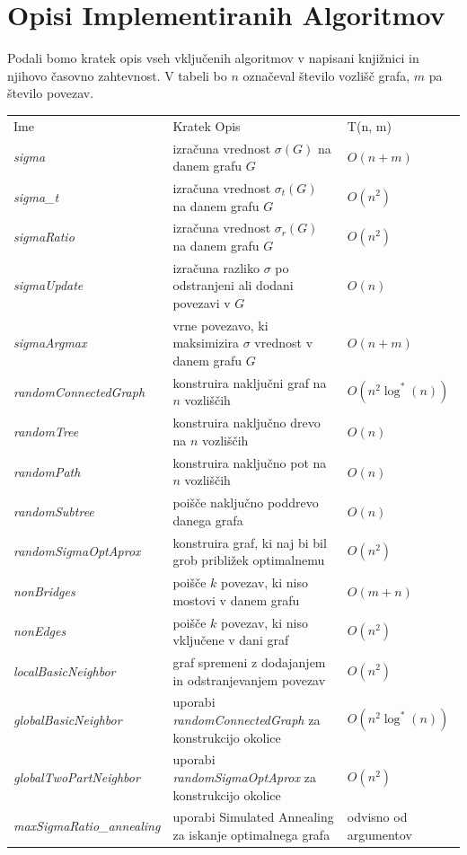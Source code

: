 \documentclass[ letterpaper, titlepage, fleqn]{article}
\begin{document}
\section{Opisi Implementiranih Algoritmov}
Podali bomo kratek opis vseh vključenih algoritmov v napisani knjižnici in njihovo časovno zahtevnost.
V tabeli bo $n$ označeval število vozlišč grafa, $m$ pa število povezav.
\begin{center}
    \begin{tabular}{ l  l  l}
      Ime & Kratek Opis & T(n, m) \\ 
      {\em sigma} & izračuna vrednost $\sigma(G)$ na danem grafu $G$ & $O(n + m)$ \\
      {\em sigma\_t} & izračuna vrednost $\sigma_t(G)$ na danem grafu $G$ & $O(n^2)$ \\
      {\em sigmaRatio} & izračuna vrednost $\sigma_r(G)$ na danem grafu $G$ & $O(n^2)$ \\
      {\em sigmaUpdate} & izračuna razliko $\sigma$ po odstranjeni ali dodani povezavi v $G$ & $O(n)$ \\
      {\em sigmaArgmax} & vrne povezavo, ki maksimizira $\sigma$ vrednost v danem grafu $G$ & $O(n + m)$ \\
      {\em randomConnectedGraph} & konstruira naključni graf na $n$ vozliščih &  $O(n^2 \log^*(n))$ \\ 
      {\em  randomTree} & konstruira naključno drevo na $n$  vozliščih & $O(n)$ \\
      {\em randomPath} & konstruira naključno pot na $n$ vozliščih & $O(n)$ \\
      {\em randomSubtree} & poišče naključno poddrevo danega grafa & $O(n)$ \\
      {\em randomSigmaOptAprox} & konstruira graf, ki naj bi bil grob približek optimalnemu & $O(n^2)$ \\
      {\em nonBridges} & poišče $k$ povezav, ki niso mostovi v danem grafu & $O(m + n)$ \\
      {\em nonEdges} & poišče $k$ povezav, ki niso vključene v dani graf & $O(n^2)$ \\
      {\em localBasicNeighbor} & graf spremeni z dodajanjem in odstranjevanjem povezav & $O(n^2)$ \\
      {\em globalBasicNeighbor} & uporabi {\em randomConnectedGraph} za konstrukcijo okolice & $O(n^2 \log^*(n))$ \\ 
      {\em globalTwoPartNeighbor} & uporabi {\em randomSigmaOptAprox} za konstrukcijo okolice & $O(n^2)$ \\
      {\em maxSigmaRatio\_annealing} & uporabi Simulated Annealing za iskanje optimalnega grafa & odvisno od argumentov \\
    \end{tabular}
  \end{center}
\end{document}
